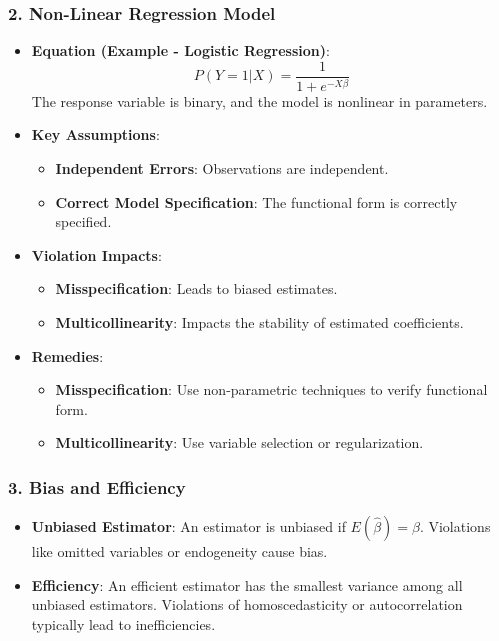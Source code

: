 \documentclass[
]{article}
\providecommand{\tightlist}{%
  \setlength{\itemsep}{0pt}\setlength{\parskip}{0pt}}\usepackage{longtable,booktabs,array}
\begin{document}
\subsubsection{\texorpdfstring{\textbf{2. Non-Linear Regression
Model}}{2. Non-Linear Regression Model}}\label{non-linear-regression-model}

\begin{itemize}
\tightlist
\item
  \textbf{Equation (Example - Logistic Regression)}:
  \[P(Y=1|X) = \frac{1}{1+e^{-X\beta}}\] The response variable is
  binary, and the model is nonlinear in parameters.
\item
  \textbf{Key Assumptions}:

  \begin{itemize}
  \tightlist
  \item
    \textbf{Independent Errors}: Observations are independent.
  \item
    \textbf{Correct Model Specification}: The functional form is
    correctly specified.
  \end{itemize}
\item
  \textbf{Violation Impacts}:

  \begin{itemize}
  \tightlist
  \item
    \textbf{Misspecification}: Leads to biased estimates.
  \item
    \textbf{Multicollinearity}: Impacts the stability of estimated
    coefficients.
  \end{itemize}
\item
  \textbf{Remedies}:

  \begin{itemize}
  \tightlist
  \item
    \textbf{Misspecification}: Use non-parametric techniques to verify
    functional form.
  \item
    \textbf{Multicollinearity}: Use variable selection or
    regularization.
  \end{itemize}
\end{itemize}

\subsubsection{\texorpdfstring{\textbf{3. Bias and
Efficiency}}{3. Bias and Efficiency}}\label{bias-and-efficiency}

\begin{itemize}
\tightlist
\item
  \textbf{Unbiased Estimator}: An estimator is unbiased if
  \(E(\hat{\beta}) = \beta\). Violations like omitted variables or
  endogeneity cause bias.
\item
  \textbf{Efficiency}: An efficient estimator has the smallest variance
  among all unbiased estimators. Violations of homoscedasticity or
  autocorrelation typically lead to inefficiencies.
\end{itemize}
\end{document}
